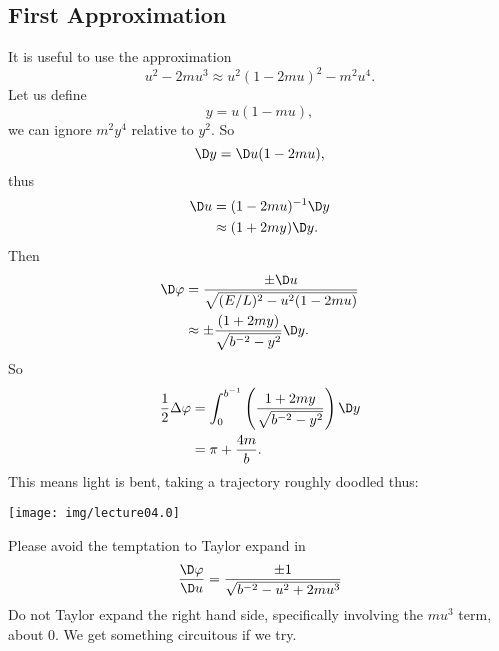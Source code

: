 \subsection{First Approximation}
It is useful to use the approximation
\begin{equation}
u^{2}-2mu^{3}\approx u^{2}(1-2mu)^{2}-m^{2}u^{4}.
\end{equation}
Let us define
\begin{equation}
y=u(1-mu),
\end{equation}
we can ignore $m^{2}y^{4}$ relative to $y^{2}$. So
\begin{equation}
\D y=\D u (1-2mu),
\end{equation}
thus
\begin{equation}
\begin{split}
\D u 
&= (1-2mu)^{-1}\D y\\
&\approx (1+2my)\D y.
\end{split}
\end{equation}
Then
\begin{equation}
\begin{split}
\D\varphi
&=\frac{\pm\D u}{\sqrt{(E/L)^{2}-u^{2}(1-2mu)}}\\
&\approx\pm\frac{(1+2my)}{\sqrt{b^{-2}-y^{2}}}\D y.
\end{split}
\end{equation}
So
\begin{equation}
\begin{split}
\frac{1}{2}\Delta\varphi
&=\int^{b^{-1}}_{0}\left(\frac{1+2my}{\sqrt{b^{-2}-y^{2}}}\right)
\D y\\
&=\pi+\frac{4m}{b}.
\end{split}
\end{equation}
This means light is bent, taking a trajectory roughly doodled
thus: 

\begin{center}
  \texttt{[image: img/lecture04.0]}
\end{center}

\begin{rmk}
Please avoid the temptation to Taylor expand in
\begin{equation}
\frac{\D\varphi}{\D u}=\frac{\pm1}{\sqrt{b^{-2}-u^{2}+2mu^{3}}}
\end{equation}
Do not Taylor expand the right hand side, specifically involving
the $mu^{3}$ term, about 0. We get something circuitous if we try.
\end{rmk}

